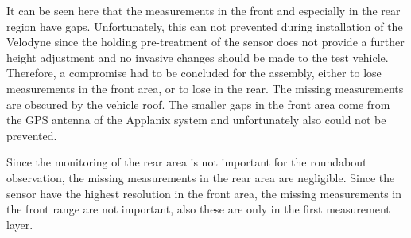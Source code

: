 \documentclass[11pt,oneside,openright]{mpreport}
\begin{document}

It can be seen here that the measurements in the front and especially in the rear region have gaps. Unfortunately, this can not prevented during installation of the Velodyne since 
the holding pre-treatment of the sensor does not provide a further height adjustment and no invasive changes should be made to the test vehicle. 
Therefore, a compromise had to be concluded for the assembly, either to lose measurements in the front area, or to lose in the rear.
The missing measurements are obscured by the vehicle roof. The smaller gaps in the front area come from the GPS antenna of the Applanix system and unfortunately also 
could not be prevented.


Since the monitoring of the rear area is not important for the roundabout observation, the missing measurements in the rear area are negligible. 
Since the sensor have the highest resolution in the front area, the missing measurements in the front range are not important,
also these are only in the first measurement layer.


\end{document}
